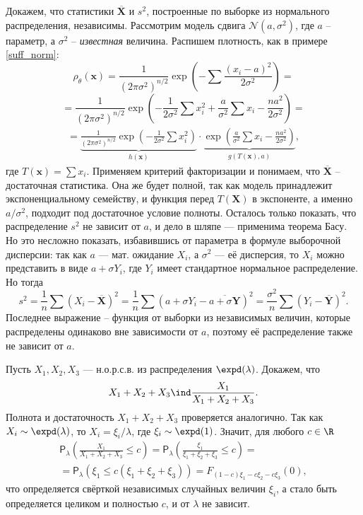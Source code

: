 \begin{example}\label{ind_of_stat_for_norm}
    Докажем, что статистики $\overline{\mathbf X}$ и $s^2$, построенные по выборке из нормального распределения, независимы. Рассмотрим модель сдвига $\mathcal{N}(a, \sigma^2)$, где $a$ -- параметр, а $\sigma^2$ -- \textit{известная} величина. Распишем плотность, как в примере \ref{suff_norm}:
    \[
    \rho_{\theta}(\mathbf{x}) = \frac{1}{(2\pi\sigma^2)^{n/2}}\exp\left(-\sum \frac{(x_i - a)^2}{2\sigma^2}\right) =
    \]
    \[
    = \frac{1}{(2\pi\sigma^2)^{n/2}}\exp\left(-\frac1{2\sigma^2}\sum x_i^2 + \frac{a}{\sigma^2}\sum x_i - \frac{na^2}{2\sigma^2}\right) =
    \]
    \begin{gather*}
    = \underbrace{\frac{1}{(2\pi\sigma^2)^{n/2}} \exp\left(-\frac1{2\sigma^2}\sum x_i^2\right)}_{h(\mathbf{x})} \cdot \underbrace{\exp\left(\frac{a}{\sigma^2}\sum x_i - \frac{na^2}{2\sigma^2}\right)}_{g(T(\mathbf{x}), a)},
    \end{gather*}
    где $T(\mathbf x)=\sum x_i$. Применяем критерий факторизации и понимаем, что $\overline{\mathbf X}$ -- достаточная статистика. Она же будет полной, так как модель принадлежит экспоненциальному семейству, и функция перед $T(\mathbf X)$ в экспоненте, а именно $a/\sigma^2$, подходит под достаточное условие полноты. Осталось только показать, что распределение $s^2$ не зависит от $a$, и дело в шляпе --- применима теорема Басу. Но это несложно показать, избавившись от параметра в формуле выборочной дисперсии: так как $a$ --- мат. ожидание $X_i$, а $\sigma^2$ --- её дисперсия, то $X_i$ можно представить в виде $a + \sigma Y_i$, где $Y_i$ имеет стандартное нормальное распределение. Но тогда
    \[
    s^2 = \frac{1}{n}\sum \left(X_i - \overline{\mathbf X}\right)^2 = \frac{1}{n}\sum \left(a + \sigma Y_i - \overline{a + \sigma\mathbf{Y}}\right)^2 = \frac{\sigma^2}{n}\sum \left(Y_i - \overline{\mathbf Y}\right)^2.
    \]
    Последнее выражение -- функция от выборки из независимых величин, которые распределены одинаково вне зависимости от $a$, поэтому её распределение также не зависит от $a$.
\end{example}

\begin{example}
    Пусть $X_1, X_2, X_3$ --- н.о.р.с.в. из распределения $\expd(\lambda)$. Докажем, что $$X_1 + X_2 + X_3 \ind \frac{X_1}{X_1+X_2+X_3}.$$ Полнота и достаточность $X_1 + X_2 + X_3$ проверяется аналогично. Так как $X_i \sim \expd(\lambda)$, то $X_i = \xi_i / \lambda$, где $\xi_i \sim \expd(1)$. Значит, для любого $c\in\R$
    \begin{gather*}
    \mathsf P_{\lambda}\left(\frac{X_1}{X_1+X_2+X_3} \le c\right) = \mathsf P_{\lambda}\left(\frac{\xi_1}{\xi_1+\xi_2+\xi_3} \le c\right) = \\
    = \mathsf P_{\lambda}\left(\xi_1 \le c(\xi_1+\xi_2+\xi_3)\right) = F_{(1-c)\xi_1-c\xi_2-c\xi_3}(0),
    \end{gather*}
    что определяется свёрткой независимых случайных величин $\xi_i$, а стало быть определяется целиком и полностью $c$, и от $\lambda$ не зависит.
\end{example}

